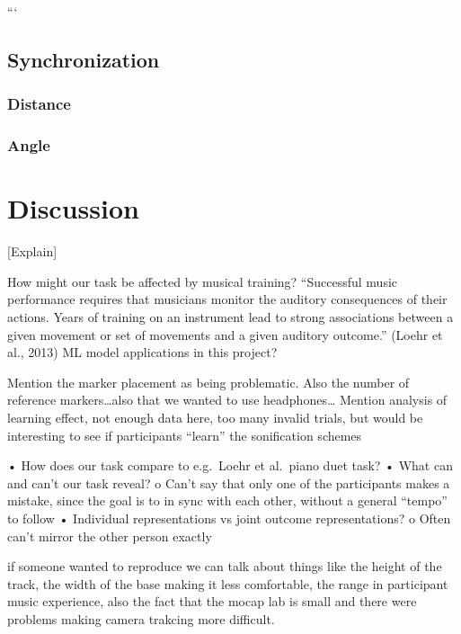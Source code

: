 \documentclass[10pt,a4paper,onecolumn]{article}
\begin{document}
```

\hypertarget{synchronization}{%
\subsection{Synchronization}\label{synchronization}}

\hypertarget{distance-1}{%
\subsubsection{Distance}\label{distance-1}}

\hypertarget{angle}{%
\subsubsection{Angle}\label{angle}}

\hypertarget{discussion}{%
\section{Discussion}\label{discussion}}

{[}Explain{]}

How might our task be affected by musical training? ``Successful music performance requires that musicians monitor the auditory consequences of their actions. Years of training on an instrument lead to strong associations between a given movement or set of movements and a given auditory outcome.'' (Loehr et al., 2013)
ML model applications in this project?

Mention the marker placement as being problematic. Also the number of reference markers\ldots also that we wanted to use headphones\ldots{}
Mention analysis of learning effect, not enough data here, too many invalid trials, but would be interesting to see if participants ``learn'' the sonification schemes

• How does our task compare to e.g.~Loehr et al.~piano duet task?
• What can and can't our task reveal?
o Can't say that only one of the participants makes a mistake, since the goal is to in sync with each other, without a general ``tempo'' to follow
• Individual representations vs joint outcome representations?
o Often can't mirror the other person exactly

if someone wanted to reproduce we can talk about things like the height of the track, the width of the base making it less comfortable, the range in participant music experience, also the fact that the mocap lab is small and there were problems making camera trakcing more difficult.
\end{document}
